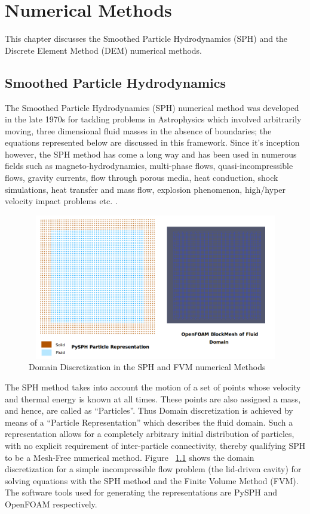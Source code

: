 \chapter{Numerical Methods}

This chapter discusses the Smoothed Particle Hydrodynamics (SPH) and the Discrete Element Method (DEM) numerical methods.

\section{Smoothed Particle Hydrodynamics}

The Smoothed Particle Hydrodynamics (SPH) numerical method was developed in the late 1970s \cite{gingold_monaghan} for tackling problems in Astrophysics which involved arbitrarily moving, three dimensional fluid masses in the absence of boundaries; the equations represented below are discussed in this framework. Since it's inception however, the SPH method has come a long way and has been used in numerous fields such as magneto-hydrodynamics, multi-phase flows, quasi-incompressible flows, gravity currents, flow through porous media, heat conduction, shock simulations, heat transfer and mass flow, explosion phenomenon, high/hyper velocity impact problems etc. \cite{liu_liu}.

\begin{figure}[htb!]
\centering
\setlength\fboxsep{0pt}
      \includegraphics[width=5in, height=2.5in]{figures/particle_rep.png}
\caption{{\small{Domain Discretization in the SPH and FVM numerical Methods}}}
\label{fig:particle_representation}
\end{figure}

The SPH method takes into account the motion of a set of points whose velocity and thermal energy is known at all times. These points are also assigned a mass, and hence, are called as ``Particles''\cite{monaghan_intro}. Thus Domain discretization is achieved by means of a ``Particle Representation'' which describes the fluid domain. Such a representation allows for a completely arbitrary initial distribution of particles, with no explicit requirement of inter-particle connectivity, thereby qualifying SPH to be a Mesh-Free numerical method. Figure ~\ref{fig:particle_representation} shows the domain discretization for a simple incompressible flow problem (the lid-driven cavity) for solving equations with the SPH method and the Finite Volume Method (FVM). The software tools used for generating the representations are PySPH \cite{prabhu_puri} and OpenFOAM \cite{foam} respectively.

